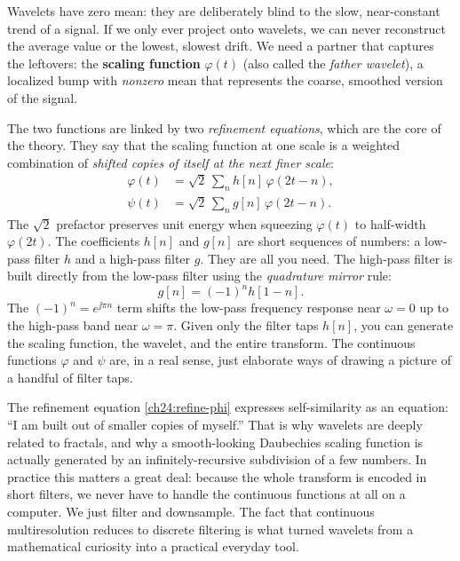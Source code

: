 Wavelets have zero mean: they are deliberately blind to
the slow, near-constant trend of a signal. If we only ever project onto wavelets,
we can never reconstruct the average value or the lowest, slowest drift. We need a
partner that captures the leftovers: the \textbf{scaling function} $\varphi(t)$
(also called the \emph{father wavelet}), a localized bump with \emph{nonzero}
mean that represents the coarse, smoothed version of the signal.

The two functions are linked by two \emph{refinement equations}, which are
the core of the theory. They say that the scaling function at
one scale is a weighted combination of \emph{shifted copies of itself at the next
finer scale}:
\begin{align}
\label{ch24:refine-phi}
\varphi(t) &= \sqrt{2}\,\sum_{n} h[n]\,\varphi(2t-n), \\
\label{ch24:refine-psi}
\psi(t) &= \sqrt{2}\,\sum_{n} g[n]\,\varphi(2t-n).
\end{align}
The $\sqrt{2}$ prefactor preserves unit energy when squeezing $\varphi(t)$ to half-width $\varphi(2t)$. The coefficients $h[n]$ and $g[n]$ are short sequences of numbers: a low-pass
filter $h$ and a high-pass filter $g$. They are all you need. The high-pass filter is built directly from the low-pass filter using the \emph{quadrature mirror} rule:
\begin{equation}
\label{ch24:qmf-rule}
  g[n] = (-1)^n h[1-n].
\end{equation}
The $(-1)^n = e^{\jj\pi n}$ term shifts the low-pass frequency response near $\omega=0$ up to the high-pass band near $\omega=\pi$. Given only the filter taps $h[n]$, you can generate the scaling function, the wavelet, and the entire transform. The continuous functions
$\varphi$ and $\psi$ are, in a real sense, just elaborate ways of drawing a
picture of a handful of filter taps.

\begin{happeningbox}
The refinement equation \eqref{ch24:refine-phi} expresses self-similarity as an
equation: ``I am built out of smaller copies of myself.'' That is why wavelets are
deeply related to fractals, and why a smooth-looking Daubechies scaling function
is actually generated by an infinitely-recursive subdivision of a few numbers. In
practice this matters a great deal: because the whole transform is encoded in short
filters, we never have to handle the continuous functions at all on a computer. We
just filter and downsample. The fact that continuous multiresolution
reduces to discrete filtering is what turned wavelets from a mathematical curiosity
into a practical everyday tool.
\end{happeningbox}

